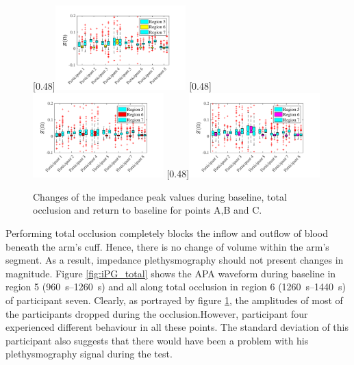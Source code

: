 \begin{figure}
	\null\hfill%
	[0.48\textwidth]{\includegraphics[width=0.45\textwidth, trim={0.5cm 0cm 1.5cm 0 cm}, clip]{figure_apa_7a}}%
	\hfill%
	[0.48\textwidth]{\includegraphics[width=0.45\textwidth, trim={0.5cm 0cm 1.5cm 0 cm}, clip]{figure_apa_7b}}%
	\hfill%
	[0.48\textwidth]{\includegraphics[width=0.45\textwidth, trim={0.5cm 0cm 1.5cm 0 cm}, clip]{figure_apa_7c}}%
	\null%
	\caption{Changes of the impedance peak values during baseline, total occlusion and return to baseline for points A,B and C.}
	\label{fig:iPG_change_points_total}
\end{figure}

Performing total occlusion completely blocks the inflow and outflow of blood beneath the arm's cuff.  Hence, there is no change of volume within the arm's segment. As a result, impedance plethysmography should not present changes in magnitude.  Figure \ref{fig:iPG_total} shows the APA waveform during baseline in region 5 (\SIrange{960}{1260}{\second}) and all along total occlusion in region 6  (\SIrange{1260}{1440}{\second}) of participant seven. Clearly, as portrayed by figure \ref{fig:iPG_change_points_total}, the amplitudes of most of the participants dropped during the occlusion.However, participant four experienced different behaviour in all these points. The standard deviation of this participant also suggests that there would have been a problem with his plethysmography signal during the test. 

